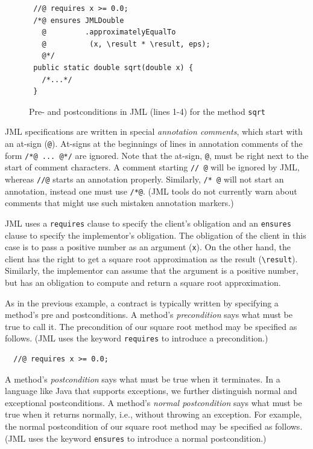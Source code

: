 \documentclass[twocolumn]{article}
\begin{document}
\begin{figure}
\begin{verbatim}
 //@ requires x >= 0.0;
 /*@ ensures JMLDouble
   @         .approximatelyEqualTo
   @          (x, \result * \result, eps);
   @*/
 public static double sqrt(double x) {
   /*...*/
 }
\end{verbatim}
\caption{Pre- and postconditions in JML (lines 1-4) for the method
  \texttt{sqrt}}
\label{fig:prepost}
\end{figure}

JML specifications are written in special \emph{annotation
comments\/}, which start with an at-sign (\texttt{@}).
At-signs at the beginnings of lines in annotation comments of the form
\texttt{/*@ ... @*/} are ignored.
Note that the at-sign, \texttt{@}, must be right next to the start of
comment characters.  A comment starting \texttt{//~@} will be ignored
by JML, whereas \texttt{//@} starts an annotation properly.
Similarly, \texttt{/*~@} will not start an annotation, instead one
must use \texttt{/*@}.  (JML tools do not currently warn about comments that
might use such mistaken annotation markers.)

JML uses a \texttt{requires} clause to specify the
client's obligation and an \texttt{ensures} clause to specify the
implementor's obligation.  The obligation of the client in this case is
to pass a positive number as an argument (\texttt{x}). On the other
hand, the client has the right to get a square root approximation as
the result ({\verb|\result|}). Similarly, the implementor can assume
that the argument is a positive number, but has an obligation to
compute and return a square root approximation.


As in the previous example,
a contract is typically written by specifying a method's pre and
postconditions.  A method's \emph{precondition} says what must be true
to call it. The precondition of our square root method may be
specified as follows. (JML uses the keyword \texttt{requires} to introduce
a precondition.)

\begin{verbatim}
  //@ requires x >= 0.0;
\end{verbatim}

A method's \emph{postcondition} says what must be true when it terminates.
In a language like Java that supports exceptions, we further
distinguish normal and exceptional postconditions.
A method's \emph{normal postcondition} says what must be true when it
returns normally, i.e., without throwing an exception. For example,
the normal postcondition of our square root method may be specified as
follows. (JML uses the keyword \texttt{ensures} to introduce a
normal postcondition.)
\end{document}
